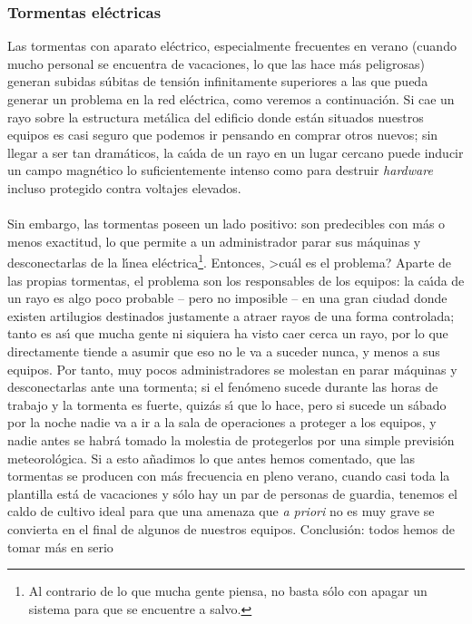 \subsubsection{Tormentas el\'ectricas}
Las tormentas con aparato el\'ectrico, especialmente frecuentes en verano 
(cuando mucho personal se encuentra de vacaciones, lo que las hace m\'as
peligrosas) generan subidas s\'ubitas de tensi\'on infinitamente superiores a
las que pueda generar un problema en la red el\'ectrica, como veremos a 
continuaci\'on. Si cae un rayo sobre la estructura met\'alica del edificio donde
est\'an situados nuestros equipos es casi seguro que podemos ir pensando en 
comprar otros nuevos; sin llegar a ser tan dram\'aticos, la ca\'{\i}da de un
rayo en un lugar cercano puede inducir un campo magn\'etico lo suficientemente
intenso como para destruir {\it hardware} incluso protegido contra voltajes
elevados.\\
\\Sin embargo, las tormentas poseen un lado positivo: son predecibles con m\'as
o menos exactitud, lo que permite a un administrador parar sus m\'aquinas y
desconectarlas de la l\'{\i}nea el\'ectrica\footnote{Al contrario de lo que
mucha gente piensa, no basta s\'olo con apagar un sistema para que se encuentre
a salvo.}. Entonces, >cu\'al es el problema? Aparte de las propias tormentas,
el problema son los responsables de los equipos: la ca\'{\i}da de un rayo es 
algo poco probable -- pero no imposible -- en una gran ciudad donde existen
artilugios destinados justamente a atraer rayos de una forma controlada; tanto
es as\'{\i} que mucha gente ni siquiera ha visto caer cerca un rayo, por lo que 
directamente tiende a asumir que eso no le va a suceder nunca, y menos a sus
equipos. Por tanto, muy pocos administradores se molestan en parar m\'aquinas
y desconectarlas ante una tormenta; si el fen\'omeno sucede durante las horas
de trabajo y la tormenta es fuerte, quiz\'as s\'{\i} que lo hace, pero si
sucede un s\'abado por la noche nadie va a ir a la sala de operaciones a 
proteger a los equipos, y nadie antes se habr\'a tomado la molestia de 
protegerlos por una simple previsi\'on meteorol\'ogica. Si a esto a\~nadimos lo
que antes hemos comentado, que las tormentas se producen con m\'as frecuencia
en pleno verano, cuando casi toda la plantilla est\'a de vacaciones y s\'olo
hay un par de personas de guardia, tenemos el caldo de cultivo ideal para que
una amenaza que {\it a priori} no es muy grave se convierta en el final de 
algunos de nuestros equipos. Conclusi\'on: todos hemos de tomar m\'as en serio
